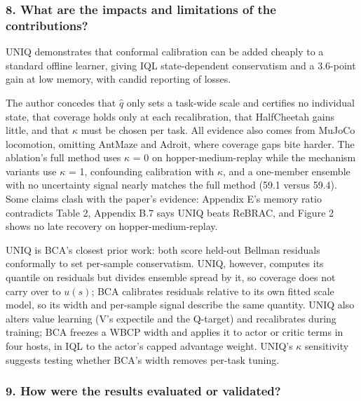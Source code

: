\documentclass[11pt]{article}
\newcommand{\question}[1]{\subsubsection*{#1}}
\begin{document}
\question{8. What are the impacts and limitations of the contributions?}

UNIQ demonstrates that conformal calibration can be added cheaply to a standard offline learner, giving IQL state-dependent conservatism and a 3.6-point gain at low memory, with candid reporting of losses.

The author concedes that $\hat{q}$ only sets a task-wide scale and certifies no individual state, that coverage holds only at each recalibration, that HalfCheetah gains little, and that \ensuremath{\kappa} must be chosen per task. All evidence also comes from MuJoCo locomotion, omitting AntMaze and Adroit, where coverage gaps bite harder. The ablation's full method uses \ensuremath{\kappa} = 0 on hopper-medium-replay while the mechanism variants use \ensuremath{\kappa} = 1, confounding calibration with \ensuremath{\kappa}, and a one-member ensemble with no uncertainty signal nearly matches the full method (59.1 versus 59.4). Some claims clash with the paper's evidence: Appendix E's memory ratio contradicts Table 2, Appendix B.7 says UNIQ beats ReBRAC, and Figure 2 shows no late recovery on hopper-medium-replay.

UNIQ is BCA's closest prior work: both score held-out Bellman residuals conformally to set per-sample conservatism. UNIQ, however, computes its quantile on residuals but divides ensemble spread by it, so coverage does not carry over to $u(s)$; BCA calibrates residuals relative to its own fitted scale model, so its width and per-sample signal describe the same quantity. UNIQ also alters value learning (V's expectile and the Q-target) and recalibrates during training; BCA freezes a WBCP width and applies it to actor or critic terms in four hosts, in IQL to the actor's capped advantage weight. UNIQ's \ensuremath{\kappa} sensitivity suggests testing whether BCA's width removes per-task tuning.

\question{9. How were the results evaluated or validated?}
\end{document}

